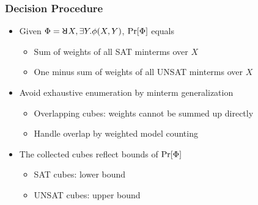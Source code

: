 \begin{frame}
    \frametitle{Decision Procedure}
    \begin{itemize}
        \item Given $\Qf=\random{} X,\exists Y.\pf(X,Y)$, $\Pr[\Phi]$ equals
              \begin{itemize}
                  \item Sum of weights of all SAT minterms over $X$
                  \item One minus sum of weights of all UNSAT minterms over $X$
              \end{itemize}
              \pause
        \item Avoid exhaustive enumeration by minterm generalization
              \begin{itemize}
                  \item Overlapping cubes: weights cannot be summed up directly
                  \item Handle overlap by weighted model counting
              \end{itemize}
              \pause
        \item The collected cubes reflect bounds of $\Pr[\Phi]$
              \begin{itemize}
                  \item SAT cubes: lower bound
                  \item UNSAT cubes: upper bound
              \end{itemize}
    \end{itemize}
\end{frame}

